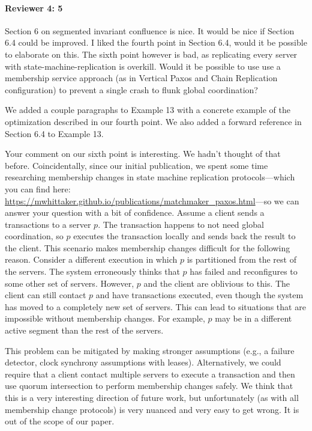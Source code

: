 \documentclass[9pt]{article}
\begin{document}
\begin{multicols*}{2}
\paragraph{Reviewer 4: 5}
\begin{feedback}
  Section 6 on segmented invariant confluence is nice. It would be nice if
  Section 6.4 could be improved. I liked the fourth point in Section 6.4, would
  it be possible to elaborate on this. The sixth point however is bad, as
  replicating every server with state-machine-replication is overkill. Would it
  be possible to use use a membership service approach (as in Vertical Paxos
  and Chain Replication configuration) to prevent a single crash to flunk
  global coordination?
\end{feedback}
We added a couple paragraphs to Example 13 with a concrete example of the
optimization described in our fourth point. We also added a forward reference
in Section 6.4 to Example 13.

Your comment on our sixth point is interesting. We hadn't thought of that
before. Coincidentally, since our initial publication, we spent some time
researching membership changes in state machine replication protocols---which
you can find here:
\url{https://mwhittaker.github.io/publications/matchmaker_paxos.html}---so we
can answer your question with a bit of confidence. Assume a client sends a
transactions to a server $p$. The transaction happens to not need global
coordination, so $p$ executes the transaction locally and sends back the result
to the client. This scenario makes membership changes difficult for the
following reason. Consider a different execution in which $p$ is partitioned
from the rest of the servers. The system erroneously thinks that $p$ has failed
and reconfigures to some other set of servers. However, $p$ and the client are
oblivious to this. The client can still contact $p$ and have transactions
executed, even though the system has moved to a completely new set of servers.
This can lead to situations that are impossible without membership changes. For
example, $p$ may be in a different active segment than the rest of the servers.

This problem can be mitigated by making stronger assumptions (e.g., a failure
detector, clock synchrony assumptions with leases). Alternatively, we could
require that a client contact multiple servers to execute a transaction and
then use quorum intersection to perform membership changes safely. We think
that this is a very interesting direction of future work, but unfortunately (as
with all membership change protocols) is very nuanced and very easy to get
wrong. It is out of the scope of our paper.


\end{multicols*}
\end{document}
